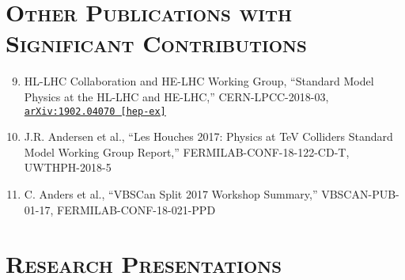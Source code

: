 \documentclass[10pt]{res} %
\begin{document}
\begin{resume}
\section{\textsc{Other Publications with Significant Contributions}}
\begin{enumerate}
  \setcounter{enumi}{8}
  \item HL-LHC Collaboration and HE-LHC Working Group, ``Standard Model Physics at the HL-LHC and HE-LHC,''
    CERN-LPCC-2018-03, \href{https://arxiv.org/abs/1902.04070} {\texttt{arXiv:1902.04070 [hep-ex]}}
  \item J.R. Andersen et al., ``Les Houches 2017: Physics at TeV Colliders Standard Model Working Group Report,''
    FERMILAB-CONF-18-122-CD-T, UWTHPH-2018-5
  \item C. Anders et al., ``VBSCan Split 2017 Workshop Summary,'' 
    VBSCAN-PUB-01-17, FERMILAB-CONF-18-021-PPD
\end{enumerate}

\section{\textsc{Research Presentations}}
\vspace{-0.1in}


\end{resume}
\end{document}
